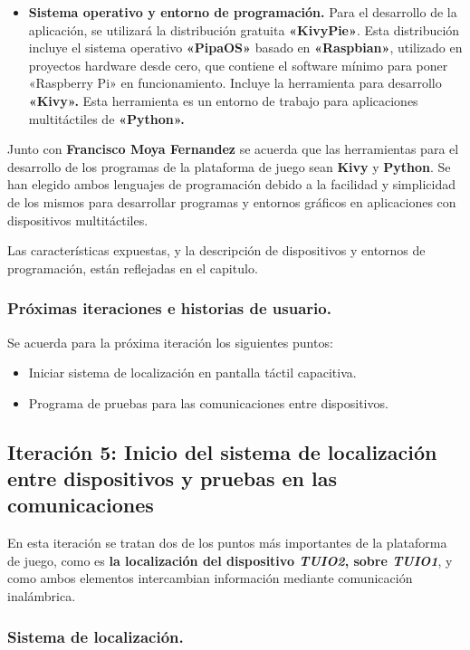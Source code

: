 \begin{itemize}
\item \textbf{Sistema operativo y entorno de programación.} Para el desarrollo de la aplicación, se utilizará la distribución gratuita \textbf{«KivyPie»}. Esta distribución incluye el sistema operativo \textbf{«PipaOS»} basado en \textbf{«Raspbian»}, utilizado en proyectos hardware desde cero, que contiene el software mínimo para poner «Raspberry Pi» en funcionamiento. Incluye la herramienta para desarrollo \textbf{«Kivy».} Esta herramienta es un entorno de trabajo para aplicaciones multitáctiles de \textbf{«Python».}
\end{itemize}

Junto con \textbf{Francisco Moya Fernandez} se acuerda que las herramientas para el desarrollo de los programas de la plataforma de juego sean \textbf{Kivy} y \textbf{Python}. Se han elegido ambos lenguajes de programación debido a la facilidad y simplicidad de los mismos para desarrollar programas y entornos gráficos en aplicaciones con dispositivos multitáctiles.


Las características expuestas, y la descripción de dispositivos y entornos de programación, están reflejadas en el capitulo.

\subsubsection{Próximas iteraciones e historias de usuario.}
Se acuerda para la próxima iteración los siguientes puntos:
\begin{itemize}
\item Iniciar sistema de localización en pantalla táctil capacitiva.
\item Programa de pruebas para las comunicaciones entre dispositivos. 
\end{itemize}


\subsection{Iteración 5: Inicio del sistema de localización entre dispositivos y pruebas en las comunicaciones }

En esta iteración se tratan dos de los puntos más importantes de la plataforma de juego, como es \textbf{la localización del dispositivo \emph{TUIO2}, sobre \emph{TUIO1}}, y como ambos elementos intercambian información mediante comunicación inalámbrica.

\subsubsection{Sistema de localización.}

